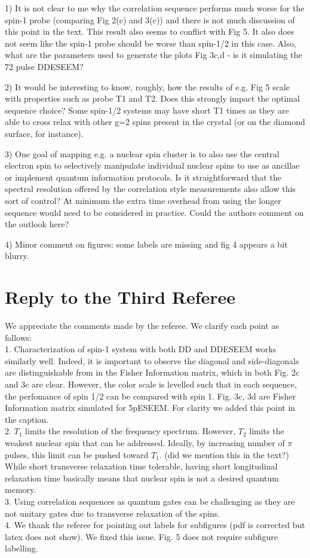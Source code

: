 \documentclass[12pt]{amsart}
\begin{document}
	1) It is not clear to me why the correlation sequence performs much
	worse for the spin-1 probe (comparing Fig 2(c) and 3(c)) and there is
	not much discussion of this point in the text. This result also seems
	to conflict with Fig 5. It also does not seem like the spin-1 probe
	should be worse than spin-1/2 in this case. Also, what are the
	parameters used to generate the plots Fig 3c,d - is it simulating the
	72 pulse DDESEEM?
	
	2) It would be interesting to know, roughly, how the results of e.g.
	Fig 5 scale with properties such as probe T1 and T2. Does this
	strongly impact the optimal sequence choice? Some spin-1/2 systems may
	have short T1 times as they are able to cross relax with other g=2
	spins present in the crystal (or on the diamond surface, for
	instance).
	
	3) One goal of mapping e.g. a nuclear spin cluster is to also use the
	central electron spin to selectively manipulate individual nuclear
	spins to use as ancillae or implement quantum information protocols.
	Is it straightforward that the spectral resolution offered by the
	correlation style measurements also allow this sort of control? At
	minimum the extra time overhead from using the longer sequence would
	need to be considered in practice. Could the authors comment on the
	outlook here?
	
	4) Minor comment on figures: some labels are missing and fig 4 appears
	a bit blurry.
	
	\color{black} \section*{ Reply to the Third Referee}
	We appreciate the comments made by the referee. We clarify each point as follows:\\
	1. Characterization of spin-1 system with both DD and DDESEEM works similarly well. Indeed, it is important to observe the diagonal and side-diagonals are distinguishable from in the Fisher Information matrix, which in both Fig. 2c and 3c are clear. However, the color scale is levelled such that in each sequence, the perfomance of spin 1/2 can be compared with spin 1. Fig. 3c, 3d are Fisher Information matrix simulated for 5pESEEM. For clarity we added this point in the caption.\\
	
	2. $T_1$ limits the resolution of the frequency spectrum. However, $T_2$ limits the weakest nuclear spin that can be addressed. Ideally, by increasing number of $\pi$ pulses, this limit can be pushed toward $T_1$. (did we mention this in the text?) While short transverse relaxation time tolerable, having short longitudinal relaxation time basically means that nuclear spin is not a desired quantum memory. \\
	
	3. Using correlation sequences as quantum gates can be challenging as they are not unitary gates due to transverse relaxation of the spins.\\
	
	4. We thank the referee for pointing out labels for subfigures (pdf is corrected but latex does not show). We fixed this issue. Fig. 5 does not require subfigure labelling.
\end{document}
